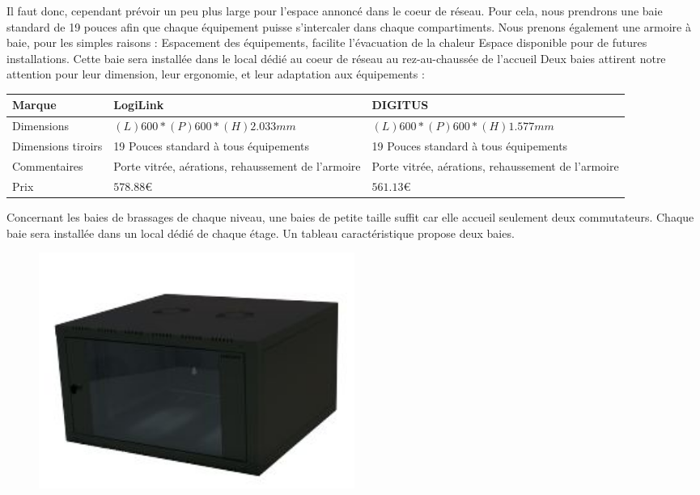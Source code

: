 Il faut donc, cependant prévoir un peu plus large pour l'espace annoncé dans le coeur de réseau. Pour cela, nous prendrons une baie standard de 19 pouces afin que chaque équipement puisse s'intercaler dans chaque compartiments. Nous prenons également une armoire à baie, pour les simples raisons :
Espacement des équipements, facilite l'évacuation de la chaleur
Espace disponible pour de futures installations.
Cette baie sera installée dans le local dédié au coeur de réseau au rez-au-chaussée de l'accueil
Deux baies attirent notre attention pour leur dimension, leur ergonomie, et leur adaptation aux équipements :

    \begin{center}
        \begin{tabular}{|l|p{5cm}|p{5cm}|}
          \hline
            Marque  & LogiLink
    &   DIGITUS
 \\
          \hline
Dimensions
  &
$(L)600 * (P)600 * (H)2.033 mm$
    & $ (L)600 * (P)600 * (H)1.577 mm $

 \\
          \hline
Dimensions tiroirs
  & 19 Pouces standard à tous équipements
    & 19 Pouces standard à tous équipements
 \\
          \hline
            Commentaires   & Porte vitrée, aérations, rehaussement de l'armoire & Porte vitrée, aérations, rehaussement de l'armoire
                  \\
        \hline
            Prix &
$ 578.88  \euro   $
    &
$ 561.13  \euro   $
 \\
          \hline
        \end{tabular}
    \end{center}

Concernant les baies de brassages de chaque niveau, une baies de petite taille suffit car elle accueil seulement deux commutateurs.
Chaque baie sera installée dans un local dédié de chaque étage. Un tableau caractéristique propose deux baies.

\begin{figure}[!ht]
    \center
    \includegraphics[width=0.5\textwidth]{./images/25.png}
\end{figure}



